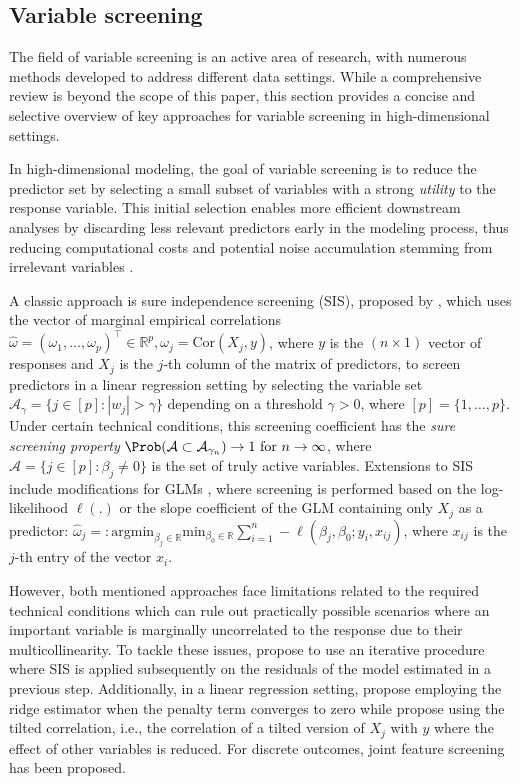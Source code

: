 \documentclass[
  article,
  nojss]{jss}
\begin{document}
\subsection{Variable screening}\label{sec-varscreen}

The field of variable screening is an active area of research, with
numerous methods developed to address different data settings. While a
comprehensive review is beyond the scope of this paper, this section
provides a concise and selective overview of key approaches for variable
screening in high-dimensional settings.

In high-dimensional modeling, the goal of variable screening is to
reduce the predictor set by selecting a small subset of variables with a
strong \emph{utility} to the response variable. This initial selection
enables more efficient downstream analyses by discarding less relevant
predictors early in the modeling process, thus reducing computational
costs and potential noise accumulation stemming from irrelevant
variables \citep[see e.g.,][]{Dunson2020TargRandProj}.

A classic approach is sure independence screening (SIS), proposed by
\citet{Fan2007SISforUHD}, which uses the vector of marginal empirical
correlations
\(\hat\omega=(\omega_1,\ldots ,\omega_p)^\top\in\mathbb{R}^p,\omega_j=\text{Cor}(X_{j},y)\),
where \(y\) is the \((n\times 1)\) vector of responses and \(X_{j}\) is
the \(j\)-th column of the matrix of predictors, to screen predictors in
a linear regression setting by selecting the variable set
\(\mathcal{A}_\gamma = \{j\in [p]:|w_j|>\gamma\}\) depending on a
threshold \(\gamma>0\), where \([p]=\{1,\dots,p\}\). Under certain
technical conditions, this screening coefficient has the \emph{sure
screening property}
\(\Prob(\mathcal{A} \subset \mathcal{A}_{\gamma_n})\to 1 \text{ for } n\to \infty\),
where \(\mathcal{A}=\{j\in[p]:\beta_j\neq 0\}\) is the set of truly
active variables. Extensions to SIS include modifications for GLMs
\citep{Fan2010sisglms}, where screening is performed based on the
log-likelihood \(\ell(.)\) or the slope coefficient of the GLM
containing only \(X_j\) as a predictor:
\(\hat\omega_j=: \text{argmin}_{\beta_j\in\mathbb{R}}\text{min}_{{\beta_0}\in\mathbb{R}}\sum_{i=1}^n -\ell(\beta_j,\beta_0;y_i,x_{ij})\),
where \(x_{ij}\) is the \(j\)-th entry of the vector \(x_i\).

However, both mentioned approaches face limitations related to the
required technical conditions which can rule out practically possible
scenarios where an important variable is marginally uncorrelated to the
response due to their multicollinearity. To tackle these issues,
\citet{fan2009ultrahigh} propose to use an iterative procedure where SIS
is applied subsequently on the residuals of the model estimated in a
previous step. Additionally, in a linear regression setting,
\citet{Wang2015HOLP} propose employing the ridge estimator when the
penalty term converges to zero while \citet{cho2012high} propose using
the tilted correlation, i.e., the correlation of a tilted version of
\(X_j\) with \(y\) where the effect of other variables is reduced. For
discrete outcomes, joint feature screening \citep{SMLE2014} has been
proposed.
\end{document}
